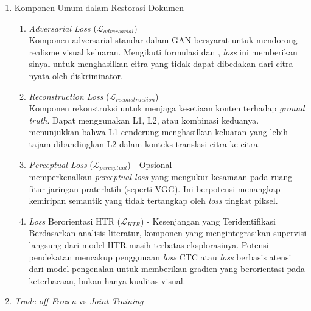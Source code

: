 \documentclass[12pt,a4paper]{article}
\begin{document}
\begin{enumerate}[leftmargin=*, labelindent=0pt, itemsep=1ex, topsep=0pt]

\item Komponen Umum dalam Restorasi Dokumen

\begin{enumerate}[leftmargin=1.5em, labelsep=0.5em, itemindent=0pt, label=\alph*., topsep=0pt, parsep=0pt, itemsep=0pt]
      \item \textit{Adversarial Loss} ($\mathcal{L}_{adversarial}$) \\
            Komponen adversarial standar dalam GAN bersyarat untuk mendorong realisme visual keluaran. Mengikuti formulasi \parencite{goodfellow2014} dan \parencite{isola2017}, \textit{loss} ini memberikan sinyal untuk menghasilkan citra yang tidak dapat dibedakan dari citra nyata oleh diskriminator.

      \item \textit{Reconstruction Loss} ($\mathcal{L}_{reconstruction}$) \\
            Komponen rekonstruksi untuk menjaga kesetiaan konten terhadap \textit{ground truth}. Dapat menggunakan L1, L2, atau kombinasi keduanya. \parencite{isola2017} menunjukkan bahwa L1 cenderung menghasilkan keluaran yang lebih tajam dibandingkan L2 dalam konteks translasi citra-ke-citra.

      \item \textit{Perceptual Loss} ($\mathcal{L}_{perceptual}$) - Opsional \\
            \textcite{johnson2016} memperkenalkan \textit{perceptual loss} yang mengukur kesamaan pada ruang fitur jaringan praterlatih (seperti VGG). Ini berpotensi menangkap kemiripan semantik yang tidak tertangkap oleh \textit{loss} tingkat piksel.

      \item \textit{Loss} Berorientasi HTR ($\mathcal{L}_{HTR}$) - Kesenjangan yang Teridentifikasi \\
            Berdasarkan analisis literatur, komponen yang mengintegrasikan supervisi langsung dari model HTR masih terbatas eksplorasinya. Potensi pendekatan mencakup penggunaan \textit{loss} CTC atau \textit{loss} berbasis atensi dari model pengenalan untuk memberikan gradien yang berorientasi pada keterbacaan, bukan hanya kualitas visual.
\end{enumerate}

\item \textit{Trade-off Frozen} vs \textit{Joint Training}


\end{enumerate}
\end{document}
